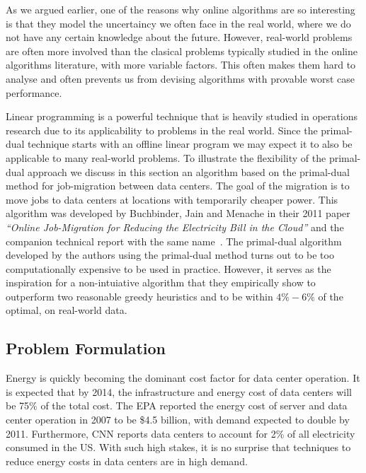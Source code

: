 As we argued earlier, one of the reasons why online algorithms are so interesting is that they model the uncertaincy we often face in the real world, where we do not have any certain knowledge about the future.
However, real-world problems are often more involved than the clasical problems typically studied in the online algorithms literature, with more variable factors.
This often makes them hard to analyse and often prevents us from devising algorithms with provable worst case performance.

Linear programming is a powerful technique that is heavily studied in operations research due to its applicability to problems in the real world.
Since the primal-dual technique starts with an offline linear program we may expect it to also be applicable to many real-world problems.
To illustrate the flexibility of the primal-dual approach we discuss in this section an algorithm based on the primal-dual method for job-migration between data centers.
The goal of the migration is to move jobs to data centers at locations with temporarily cheaper power.
This algorithm was developed by Buchbinder, Jain and Menache in their 2011 paper \emph{``Online Job-Migration for Reducing the Electricity Bill in the Cloud''} and the companion technical report with the same name~\cite{buchbinder11:job-migration,buchbinder11:job-migration-techreport}.
The primal-dual algorithm developed by the authors using the primal-dual method turns out to be too computationally expensive to be used in practice.
However, it serves as the inspiration for a non-intuiative algorithm that they empirically show to outperform two reasonable greedy heuristics and to be within $4\%-6\%$ of the optimal, on real-world data.

\subsection{Problem Formulation}

Energy is quickly becoming the dominant cost factor for data center operation.
It is expected that by 2014, the infrastructure and energy cost of data centers will be 75\% of the total cost.
The EPA reported the energy cost of server and data center operation in 2007 to be \$4.5 billion, with demand expected to double by 2011.
Furthermore, CNN reports data centers to account for 2\% of all electricity consumed in the US.
With such high stakes, it is no surprise that techniques to reduce energy costs in data centers are in high demand.


